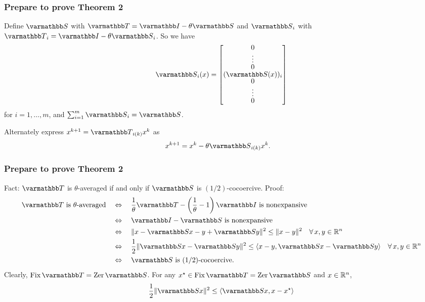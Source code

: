 \documentclass[10pt,mathserif]{beamer}
\begin{document}
\begin{frame}[fragile]
\frametitle{Prepare to prove Theorem 2}
Define $\opS $ with $\opT  = \opI  - \theta \opS $ and $\opS _i$ with $\opT _i=\opI -\theta \opS _i$.
So we have
\begingroup\makeatletter\def\f@size{8}\check@mathfonts
\[
\begingroup
\renewcommand*{\arraystretch}{.8}
\opS _i(x)=
\begin{bmatrix}
0\\
\vdots\\
0\\
(\opS (x))_i\\
0\\
\vdots\\
0
\end{bmatrix}
\endgroup
\]
\endgroup
for $i=1,\dots,m$, and $\sum_{i=1}^m \opS_i = \opS$.


\medskip\pause

Alternately express $x^{k+1}=\opT _{i(k)}x^k$ as
\begin{align*}
  x^{k+1}&= x^k - \theta \opS _{i(k)}x^k.
\end{align*}
\end{frame}

\begin{frame}[fragile]
\frametitle{Prepare to prove Theorem 2}
Fact: $\opT $ is $\theta$-averaged if and only if $\opS $ is $(1/2)$-cocoercive. Proof:
\begin{align*}
\opT \text{ is $\theta$-averaged}
\quad&\Leftrightarrow\quad
\frac{1}{\theta}\opT -\left(\frac{1}{\theta}-1\right)\opI \text{ is nonexpansive}\\
&\Leftrightarrow\quad
\opI -\opS  \text{ is nonexpansive}\\
&\Leftrightarrow\quad
\|x-\opS x-y+\opS y\|^2\le \|x-y\|^2\quad\forall\, x,y\in \reals^n\\
&\Leftrightarrow\quad
\frac{1}{2}\|\opS x-\opS y\|^2\le \langle x-y,\opS x-\opS y\rangle\quad\forall\, x,y\in \reals^n\\
&\Leftrightarrow\quad
\opS \text{ is $(1/2)$-cocoercive}.
\end{align*}
\pause Clearly, $\fix\opT=\zer\opS$.
For any $x^\star\in \fix \opT =\zer\opS$ and $x\in \mathbb{R}^n$,
\begin{align}\label{eq:Rcocoer}
\frac{1}{2}\|\opS  x\|^2\le   \langle \opS  x, x-x^\star\rangle
\end{align}
\end{frame}
\end{document}
